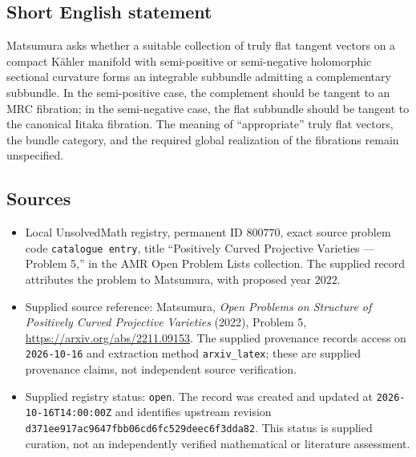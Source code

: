 \documentclass[11pt]{article}
\begin{document}
\subsection{Short English statement}
Matsumura asks whether a suitable collection of truly flat tangent vectors on a compact K\"ahler manifold with semi-positive or semi-negative holomorphic sectional curvature forms an integrable subbundle admitting a complementary subbundle. In the semi-positive case, the complement should be tangent to an MRC fibration; in the semi-negative case, the flat subbundle should be tangent to the canonical Iitaka fibration. The meaning of ``appropriate'' truly flat vectors, the bundle category, and the required global realization of the fibrations remain unspecified.
\subsection{Sources}
\begin{itemize}
\item Local UnsolvedMath registry, permanent ID \(800770\), exact source problem code \texttt{catalogue entry}, title ``Positively Curved Projective Varieties --- Problem 5,'' in the AMR Open Problem Lists collection. The supplied record attributes the problem to Matsumura, with proposed year \(2022\).
\item Supplied source reference: Matsumura, \emph{Open Problems on Structure of Positively Curved Projective Varieties} (2022), Problem 5, \url{https://arxiv.org/abs/2211.09153}. The supplied provenance records access on \texttt{2026-10-16} and extraction method \texttt{arxiv\_latex}; these are supplied provenance claims, not independent source verification.
\item Supplied registry status: \texttt{open}. The record was created and updated at \texttt{2026-10-16T14:00:00Z} and identifies upstream revision \texttt{d371ee917ac9647fbb06cd6fc529deec6f3dda82}. This status is supplied curation, not an independently verified mathematical or literature assessment.
\end{itemize}
\end{document}
